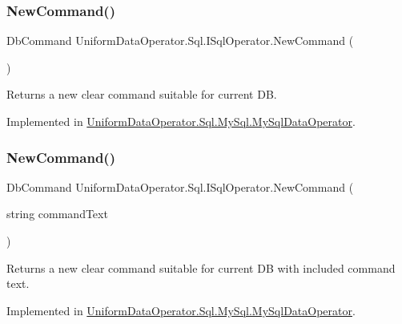 \subsubsection{\texorpdfstring{New\+Command()}{NewCommand()}\hspace{0.1cm}{\footnotesize\ttfamily [1/2]}}
{\footnotesize\ttfamily Db\+Command Uniform\+Data\+Operator.\+Sql.\+I\+Sql\+Operator.\+New\+Command (\begin{DoxyParamCaption}{ }\end{DoxyParamCaption})}



Returns a new clear command suitable for current DB. 



Implemented in \mbox{\hyperlink{class_uniform_data_operator_1_1_sql_1_1_my_sql_1_1_my_sql_data_operator_af5850bfb38f7dfcd5acd5157458ef4bd}{Uniform\+Data\+Operator.\+Sql.\+My\+Sql.\+My\+Sql\+Data\+Operator}}.

\mbox{\label{interface_uniform_data_operator_1_1_sql_1_1_i_sql_operator_a10c43a3bfb6e8c88b692488c3341f297}} 
\subsubsection{\texorpdfstring{New\+Command()}{NewCommand()}\hspace{0.1cm}{\footnotesize\ttfamily [2/2]}}
{\footnotesize\ttfamily Db\+Command Uniform\+Data\+Operator.\+Sql.\+I\+Sql\+Operator.\+New\+Command (\begin{DoxyParamCaption}\item[{string}]{command\+Text }\end{DoxyParamCaption})}



Returns a new clear command suitable for current DB with included command text. 



Implemented in \mbox{\hyperlink{class_uniform_data_operator_1_1_sql_1_1_my_sql_1_1_my_sql_data_operator_a6c2e2d374072c275953a515379963881}{Uniform\+Data\+Operator.\+Sql.\+My\+Sql.\+My\+Sql\+Data\+Operator}}.

